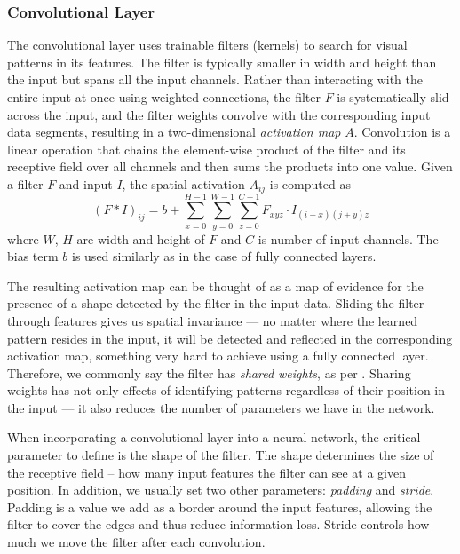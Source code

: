 \subsubsection{Convolutional Layer}

The convolutional layer uses trainable filters (kernels) to search for visual patterns in its features.
The filter is typically smaller in width and height than the input but spans all the input channels.
Rather than interacting with the entire input at once using weighted connections, the filter $F$ is systematically slid across the input, and the filter weights convolve with the corresponding input data segments, resulting in a two-dimensional \emph{activation map} $A$.
Convolution is a linear operation that chains the element-wise product of the filter and its receptive field over all channels and then sums the products into one value. Given a filter $F$ and input $I$, the spatial activation $A_{ij}$ is computed as 
\begin{equation}
    (F * I)_{ij} = b + \sum_{x=0}^{H-1} \sum_{y=0}^{W-1} \sum_{z=0}^{C-1} F_{xyz} \cdot I_{(i+x)(j+y)z}
\end{equation}
where $W$, $H$ are width and height of $F$ and $C$ is number of input channels. The bias term $b$ is used similarly as in the case of fully connected layers.

The resulting activation map can be thought of as a map of evidence for the presence of a shape detected by the filter in the input data.
Sliding the filter through features gives us spatial invariance --- no matter where the learned pattern resides in the input, it will be detected and reflected in the corresponding activation map, something very hard to achieve using a fully connected layer.
Therefore, we commonly say the filter has \emph{shared weights}, as per \cite{goodfellow}.
Sharing weights has not only effects of identifying patterns regardless of their position in the input --- it also reduces the number of parameters we have in the network.

When incorporating a convolutional layer into a neural network, the critical parameter to define is the shape of the filter.
The shape determines the size of the receptive field -- how many input features the filter can see at a given position.
In addition, we usually set two other parameters: \emph{padding} and \emph{stride}.
Padding is a value we add as a border around the input features, allowing the filter to cover the edges and thus reduce information loss.
Stride controls how much we move the filter after each convolution.

